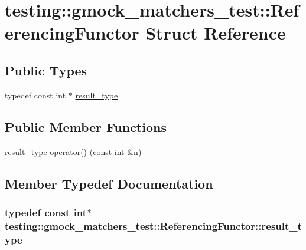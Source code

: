\hypertarget{structtesting_1_1gmock__matchers__test_1_1_referencing_functor}{}\section{testing\+:\+:gmock\+\_\+matchers\+\_\+test\+:\+:Referencing\+Functor Struct Reference}
\label{structtesting_1_1gmock__matchers__test_1_1_referencing_functor}
\subsection*{Public Types}
\begin{DoxyCompactItemize}
\item 
typedef const int $\ast$ \hyperlink{structtesting_1_1gmock__matchers__test_1_1_referencing_functor_a5856a8175e2f797a6733a363b2834094}{result\+\_\+type}
\end{DoxyCompactItemize}
\subsection*{Public Member Functions}
\begin{DoxyCompactItemize}
\item 
\hyperlink{structtesting_1_1gmock__matchers__test_1_1_referencing_functor_a5856a8175e2f797a6733a363b2834094}{result\+\_\+type} \hyperlink{structtesting_1_1gmock__matchers__test_1_1_referencing_functor_a149f15ed9afbff28f5c3639c0f3eb255}{operator()} (const int \&n)
\end{DoxyCompactItemize}


\subsection{Member Typedef Documentation}
\subsubsection[{\texorpdfstring{result\+\_\+type}{result_type}}]{\setlength{\rightskip}{0pt plus 5cm}typedef const int$\ast$ {\bf testing\+::gmock\+\_\+matchers\+\_\+test\+::\+Referencing\+Functor\+::result\+\_\+type}}\hypertarget{structtesting_1_1gmock__matchers__test_1_1_referencing_functor_a5856a8175e2f797a6733a363b2834094}{}\label{structtesting_1_1gmock__matchers__test_1_1_referencing_functor_a5856a8175e2f797a6733a363b2834094}


